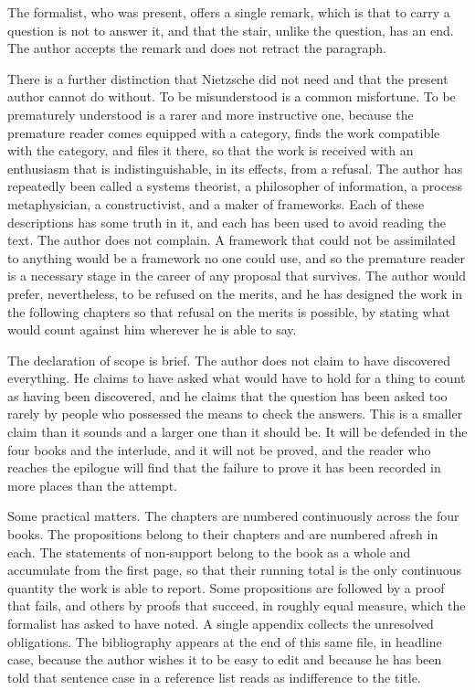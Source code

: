 \documentclass[11pt,openany,twoside]{book}
\theoremstyle{plain}
\theoremstyle{definition}
\theoremstyle{remark}
\begin{document}
The formalist, who was present, offers a single remark, which is that to carry a question is not to answer it, and that the stair, unlike the question, has an end. The author accepts the remark and does not retract the paragraph.

There is a further distinction that Nietzsche did not need and that the present author cannot do without. To be misunderstood is a common misfortune. To be prematurely understood is a rarer and more instructive one, because the premature reader comes equipped with a category, finds the work compatible with the category, and files it there, so that the work is received with an enthusiasm that is indistinguishable, in its effects, from a refusal. The author has repeatedly been called a systems theorist, a philosopher of information, a process metaphysician, a constructivist, and a maker of frameworks. Each of these descriptions has some truth in it, and each has been used to avoid reading the text. The author does not complain. A framework that could not be assimilated to anything would be a framework no one could use, and so the premature reader is a necessary stage in the career of any proposal that survives. The author would prefer, nevertheless, to be refused on the merits, and he has designed the work in the following chapters so that refusal on the merits is possible, by stating what would count against him wherever he is able to say.

The declaration of scope is brief. The author does not claim to have discovered everything. He claims to have asked what would have to hold for a thing to count as having been discovered, and he claims that the question has been asked too rarely by people who possessed the means to check the answers. This is a smaller claim than it sounds and a larger one than it should be. It will be defended in the four books and the interlude, and it will not be proved, and the reader who reaches the epilogue will find that the failure to prove it has been recorded in more places than the attempt.

Some practical matters. The chapters are numbered continuously across the four books. The propositions belong to their chapters and are numbered afresh in each. The statements of non-support belong to the book as a whole and accumulate from the first page, so that their running total is the only continuous quantity the work is able to report. Some propositions are followed by a proof that fails, and others by proofs that succeed, in roughly equal measure, which the formalist has asked to have noted. A single appendix collects the unresolved obligations. The bibliography appears at the end of this same file, in headline case, because the author wishes it to be easy to edit and because he has been told that sentence case in a reference list reads as indifference to the title.
\end{document}
